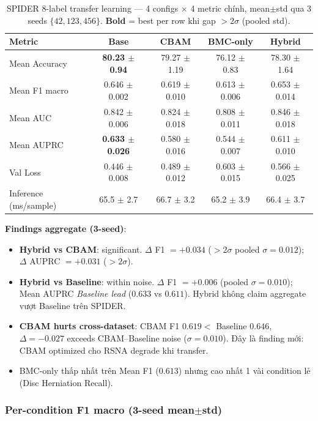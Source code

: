 \documentclass[11pt,a4paper]{article}
\newcommand{\best}[1]{\textcolor{best}{\textbf{#1}}}
\begin{document}
\begin{table}[h]
\centering
\caption{SPIDER 8-label transfer learning --- 4 configs $\times$ 4
metric chính, mean$\pm$std qua 3 seeds $\{42,123,456\}$. \best{Bold}
= best per row khi gap $> 2\sigma$ (pooled std).}
\label{tab:spider_aggregate}
\footnotesize
\begin{tabular}{@{}lcccc@{}}
\toprule
\rowcolor{tablehdr}
Metric & Base & CBAM & BMC-only & Hybrid \\
\midrule
Mean Accuracy & \best{80.23 $\pm$ 0.94} & 79.27 $\pm$ 1.19 & 76.12 $\pm$ 0.83 & 78.30 $\pm$ 1.64 \\
Mean F1 macro & 0.646 $\pm$ 0.002 & 0.619 $\pm$ 0.010 & 0.613 $\pm$ 0.006 & 0.653 $\pm$ 0.014 \\
Mean AUC      & 0.842 $\pm$ 0.006 & 0.824 $\pm$ 0.018 & 0.808 $\pm$ 0.011 & 0.846 $\pm$ 0.018 \\
Mean AUPRC    & \best{0.633 $\pm$ 0.026} & 0.580 $\pm$ 0.016 & 0.544 $\pm$ 0.007 & 0.611 $\pm$ 0.010 \\
\midrule
Val Loss              & 0.446 $\pm$ 0.008 & 0.489 $\pm$ 0.012 & 0.603 $\pm$ 0.015 & 0.566 $\pm$ 0.025 \\
Inference (ms/sample) & 65.5 $\pm$ 2.7 & 66.7 $\pm$ 3.2 & 65.2 $\pm$ 3.9 & 66.4 $\pm$ 3.7 \\
\bottomrule
\end{tabular}
\end{table}

\noindent\textbf{Findings aggregate (3-seed)}:
\begin{itemize}[leftmargin=*]
\item \textbf{Hybrid vs CBAM}: significant. $\Delta$ F1 $= +0.034$
($> 2\sigma$ pooled $\sigma=0.012$); $\Delta$ AUPRC $= +0.031$ ($> 2\sigma$).
\item \textbf{Hybrid vs Baseline}: within noise. $\Delta$ F1 $= +0.006$
(pooled $\sigma = 0.010$); Mean AUPRC \emph{Baseline lead}
($0.633$ vs $0.611$). Hybrid không claim aggregate vượt Baseline trên
SPIDER.
\item \textbf{CBAM hurts cross-dataset}: CBAM F1 $0.619 < $ Baseline
$0.646$, $\Delta = -0.027$ exceeds CBAM--Baseline noise ($\sigma =
0.010$). Đây là finding mới: CBAM optimized cho RSNA degrade khi
transfer.
\item BMC-only thấp nhất trên Mean F1 ($0.613$) nhưng cao nhất 1 vài
condition lẻ (Disc Herniation Recall).
\end{itemize}

\subsubsection*{Per-condition F1 macro (3-seed mean$\pm$std)}
\end{document}
